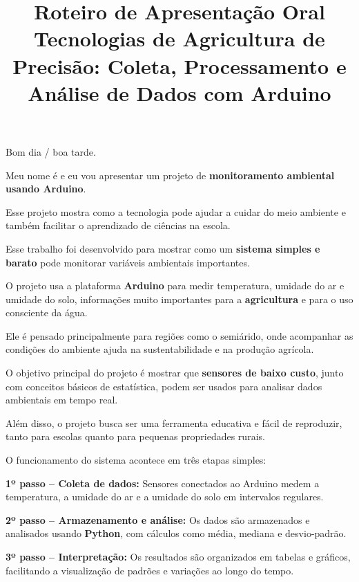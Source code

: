 \documentclass[12pt]{article}
\title{
\textcolor{roxo}{Roteiro de Apresentação Oral}\\
\textbf{\textcolor{azul}{Tecnologias de Agricultura de Precisão: Coleta, Processamento e Análise de Dados com Arduino}}
}
\author{}
\date{}
\begin{document}
\maketitle

\onehalfspacing

\begin{tcolorbox}[colback=blue!5,colframe=azul,title=\textbf{Abertura}]
Bom dia / boa tarde.

Meu nome é \underline{\hspace{5cm}} e eu vou apresentar um projeto de \textbf{monitoramento ambiental usando Arduino}.

Esse projeto mostra como a tecnologia pode ajudar a cuidar do meio ambiente e também facilitar o aprendizado de ciências na escola.
\end{tcolorbox}

\begin{tcolorbox}[colback=green!5,colframe=verde,title=\textbf{Introdução}]
Esse trabalho foi desenvolvido para mostrar como um \textbf{sistema simples e barato} pode monitorar variáveis ambientais importantes.

O projeto usa a plataforma \textbf{Arduino} para medir temperatura, umidade do ar e umidade do solo, informações muito importantes para a \textbf{agricultura} e para o uso consciente da água.

Ele é pensado principalmente para regiões como o semiárido, onde acompanhar as condições do ambiente ajuda na sustentabilidade e na produção agrícola.
\end{tcolorbox}

\begin{tcolorbox}[colback=orange!5,colframe=laranja,title=\textbf{Objetivo do Projeto}]
O objetivo principal do projeto é mostrar que \textbf{sensores de baixo custo}, junto com conceitos básicos de estatística, podem ser usados para analisar dados ambientais em tempo real.

Além disso, o projeto busca ser uma ferramenta educativa e fácil de reproduzir, tanto para escolas quanto para pequenas propriedades rurais.
\end{tcolorbox}

\begin{tcolorbox}[colback=purple!5,colframe=roxo,title=\textbf{Como o Projeto Funciona}]
O funcionamento do sistema acontece em três etapas simples:

\textbf{1º passo -- Coleta de dados:} Sensores conectados ao Arduino medem a temperatura, a umidade do ar e a umidade do solo em intervalos regulares.

\textbf{2º passo -- Armazenamento e análise:} Os dados são armazenados e analisados usando \textbf{Python}, com cálculos como média, mediana e desvio-padrão.

\textbf{3º passo -- Interpretação:} Os resultados são organizados em tabelas e gráficos, facilitando a visualização de padrões e variações ao longo do tempo.
\end{tcolorbox}
\end{document}
